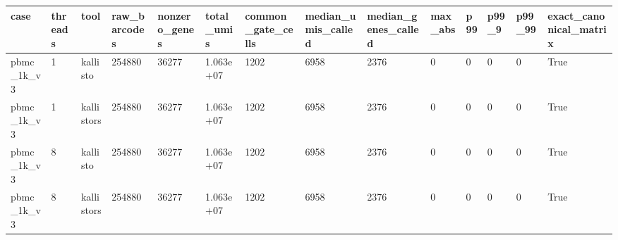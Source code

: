 \begin{tabular}{llllllllllllll}
\toprule
case & threads & tool & raw\_barcodes & nonzero\_genes & total\_umis & common\_gate\_cells & median\_umis\_called & median\_genes\_called & max\_abs & p99 & p99\_9 & p99\_99 & exact\_canonical\_matrix \\
\midrule
pbmc\_1k\_v3 & 1 & kallisto & 254880 & 36277 & 1.063e+07 & 1202 & 6958 & 2376 & 0 & 0 & 0 & 0 & True \\
pbmc\_1k\_v3 & 1 & kallistors & 254880 & 36277 & 1.063e+07 & 1202 & 6958 & 2376 & 0 & 0 & 0 & 0 & True \\
pbmc\_1k\_v3 & 8 & kallisto & 254880 & 36277 & 1.063e+07 & 1202 & 6958 & 2376 & 0 & 0 & 0 & 0 & True \\
pbmc\_1k\_v3 & 8 & kallistors & 254880 & 36277 & 1.063e+07 & 1202 & 6958 & 2376 & 0 & 0 & 0 & 0 & True \\
\bottomrule
\end{tabular}
